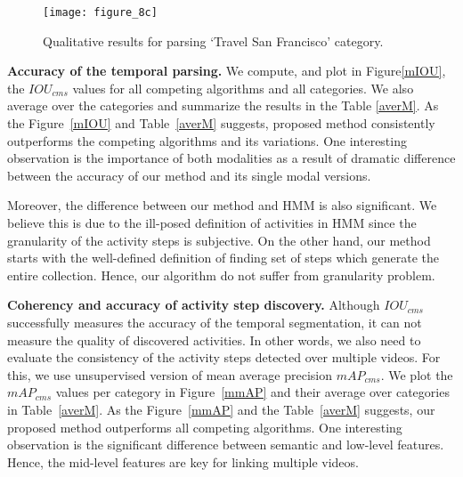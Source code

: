 \begin{figure}[t]
  \texttt{[image: figure\_8c]}
  \vspace{-6mm}
  \caption{Qualitative results for parsing `Travel San Francisco' category.}
  \vspace{-2mm}
  \label{sf}
\end{figure}


\vspace{1mm}
\noindent\textbf{Accuracy of the temporal parsing.}
We compute, and plot in Figure\ref{mIOU}, the $IOU_{cms}$ values for all competing algorithms and all categories. We also average over the categories and summarize the results in the Table \ref{averM}. As the Figure~\ref{mIOU} and Table~\ref{averM} suggests, proposed method consistently outperforms the competing algorithms and its variations. One interesting observation is the importance of both modalities as a result of dramatic difference between the accuracy of our method and its single modal versions.

Moreover, the difference between our method and HMM is also significant. We believe this is due to the ill-posed definition of activities in HMM since the granularity of the activity steps is subjective. On the other hand, our method starts with the well-defined definition of finding set of steps which generate the entire collection. Hence, our algorithm do not suffer from granularity problem.
\begin{table}
\caption{Average of $IOU_{cms}$ and $mAP_{cms}$ over recipes.}
{\small
{}}
\normalsize
\label{averM}
\vspace{-5mm}
\end{table}

\vspace{1mm}
\noindent\textbf{Coherency and accuracy of activity step discovery.}
Although $IOU_{cms}$ successfully measures the accuracy of the temporal segmentation, it can not measure the quality of discovered activities. In other words, we also need to evaluate the consistency of the activity steps detected over multiple videos. For this, we use unsupervised version of mean average precision $mAP_{cms}$. We plot the $mAP_{cms}$ values per category in Figure~\ref{mmAP} and their average over categories in Table~\ref{averM}. As the Figure~\ref{mmAP} and the Table~\ref{averM} suggests, our proposed method outperforms all competing algorithms. One interesting observation is the significant difference between semantic and low-level features. Hence, the mid-level features are key for linking multiple videos.

